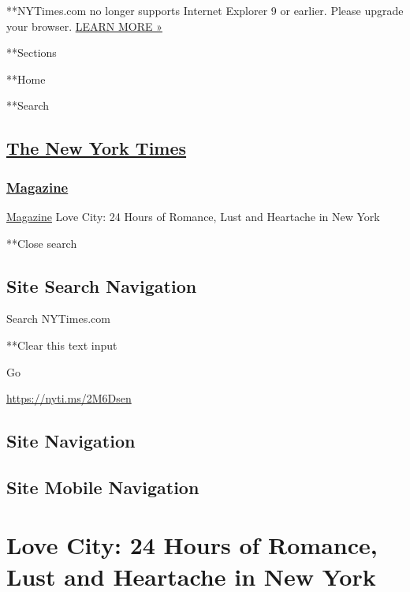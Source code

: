  **NYTimes.com no longer supports Internet Explorer 9 or earlier. Please
upgrade your browser.
\href{http://www.nytimes3xbfgragh.onion/content/help/site/ie9-support.html}{LEARN
MORE »}

**Sections

**Home

**Search

\hypertarget{the-new-york-times}{%
\subsection{\texorpdfstring{\href{http://www.nytimes3xbfgragh.onion/}{The
New York Times}}{The New York Times}}\label{the-new-york-times}}

\hypertarget{-magazine-}{%
\subsubsection{\texorpdfstring{
\href{https://www.nytimes3xbfgragh.onion/section/magazine}{Magazine}
}{ Magazine }}\label{-magazine-}}

 \href{https://www.nytimes3xbfgragh.onion/section/magazine}{Magazine}
\textbar{}Love City: 24 Hours of Romance, Lust and Heartache in New York

**Close search

\hypertarget{site-search-navigation}{%
\subsection{Site Search Navigation}\label{site-search-navigation}}

Search NYTimes.com

**Clear this text input

Go

\url{https://nyti.ms/2M6Dsen}

\hypertarget{site-navigation}{%
\subsection{Site Navigation}\label{site-navigation}}

\hypertarget{site-mobile-navigation}{%
\subsection{Site Mobile Navigation}\label{site-mobile-navigation}}

\hypertarget{love-city-24-hours-of-romance-lust-and-heartache-in-new-york}{%
\section{Love City: 24 Hours of Romance, Lust and Heartache in New
York}\label{love-city-24-hours-of-romance-lust-and-heartache-in-new-york}}

